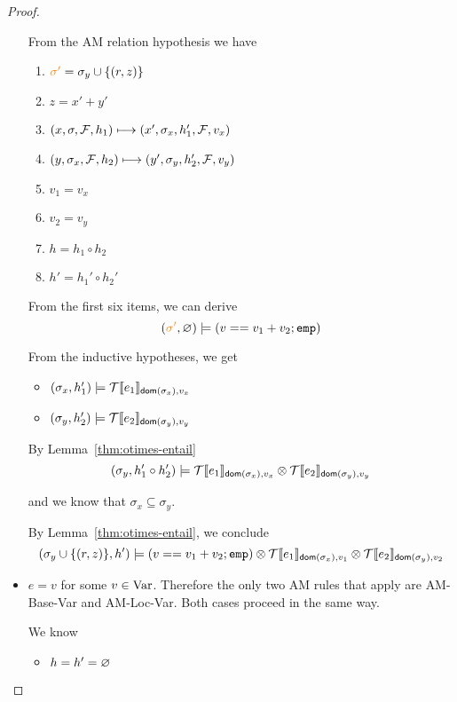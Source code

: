 \begin{proof}
\begin{itemize}
      From the {\sc AM} relation hypothesis we have
      \begin{enumerate}
        \item ${\color{orange} \sigma'} = \sigma_y \cup \{(r, z)\}$
        \item $z = x' + y'$
        \item $(x, \sigma, \mathcal{F}, h_1) \longmapsto (x', \sigma_x, h_1', \mathcal{F}, v_x)$
        \item $(y, \sigma_x, \mathcal{F}, h_2) \longmapsto (y', \sigma_y, h_2', \mathcal{F}, v_y)$
        \item $v_1 = v_x$
        \item $v_2 = v_y$
        \item $h = h_1 \circ h_2$
        \item $h' = h_1' \circ h_2'$
      \end{enumerate}

      From the first six items, we can derive
      \[
        ({\color{orange} \sigma'}, \varnothing) \models (v == v_1 + v_2 ; \texttt{emp})
      \]

      From the inductive hypotheses, we get
      \begin{itemize}
        \item $(\sigma_x, h_1') \models \mathcal{T}\llbracket e_1\rrbracket_{\textsf{dom}(\sigma_x), v_x}$
        \item $(\sigma_y, h_2') \models \mathcal{T}\llbracket e_2\rrbracket_{\textsf{dom}(\sigma_y), v_y}$
      \end{itemize}

      By Lemma~\ref{thm:otimes-entail}
      \[
        (\sigma_y, h_1' \circ h_2') \models \mathcal{T}\llbracket e_1\rrbracket_{\textsf{dom}(\sigma_x), v_x} \otimes \mathcal{T}\llbracket e_2\rrbracket_{\textsf{dom}(\sigma_y), v_y}
      \]

      and we know that $\sigma_x \subseteq \sigma_y$.

      By Lemma~\ref{thm:otimes-entail}, we conclude
      \[
        (\sigma_y \cup \{(r, z)\}, h') \models (v == v_1 + v_2 ; \texttt{emp}) \otimes \mathcal{T}\llbracket e_1\rrbracket_{\textsf{dom}(\sigma_x),v_1} \otimes \mathcal{T}\llbracket e_2\rrbracket_{\textsf{dom}(\sigma_y),v_2}
      \]

    \item $e = v$ for some $v \in \textnormal{Var}$.
      Therefore the only two {\sc AM} rules that apply are {\sc AM-Base-Var} and {\sc AM-Loc-Var}. Both
      cases proceed in the same way.

      We know
      \begin{itemize}
        \item $h = h' = \varnothing$
      \end{itemize}


\end{itemize}
\end{proof}
